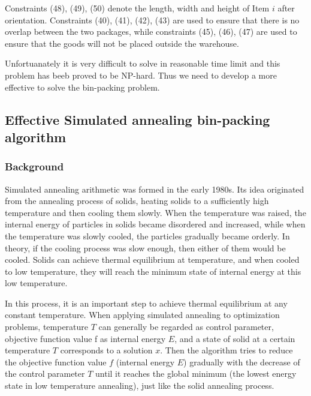 \documentclass{mcmthesis}
\begin{document}
\noindent Constraints (48), (49), (50) denote the length, width and height of Item $i$ after orientation. Constraints (40), (41), (42), (43) are used to ensure that there is no overlap between the two packages, while constraints (45), (46), (47) are used to ensure that the goods will not be placed outside the warehouse. 

\noindent Unfortuanately it is very difficult to solve in reasonable time limit and this problem has beeb proved to be NP-hard. Thus we need to develop a more effective to solve the bin-packing problem.  


\subsection{Effective Simulated annealing bin-packing algorithm}
\subsubsection{Background}
Simulated annealing arithmetic was formed in the early 1980s. Its idea originated from the annealing process of solids, heating solids to a sufficiently high temperature and then cooling them slowly. When the temperature was raised, the internal energy of particles in solids became disordered and increased, while when the temperature was slowly cooled, the particles gradually became orderly. In theory, if the cooling process was slow enough, then either of them would be cooled. Solids can achieve thermal equilibrium at temperature, and when cooled to low temperature, they will reach the minimum state of internal energy at this low temperature.      

\noindent In this process, it is an important step to achieve thermal equilibrium at any constant temperature. When applying simulated annealing to optimization problems, temperature $T$ can generally be regarded as control parameter, objective function value f as internal energy $E$, and a state of solid at a certain temperature $T$ corresponds to a solution $x$. Then the algorithm tries to reduce the objective function value $f$ (internal energy $E$) gradually with the decrease of the control parameter $T$ until it reaches the global minimum (the lowest energy state in low temperature annealing), just like the solid annealing process.
\end{document}
